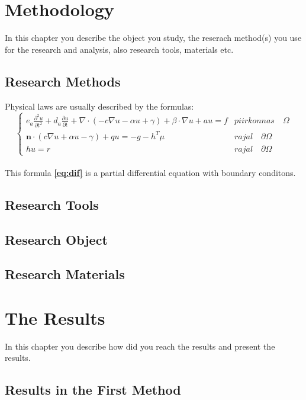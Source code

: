 \documentclass[12pt]{report}
\begin{document}
\chapter{Methodology}
In this chapter you describe the object you study, the reserach method(s) you use for the research and analysis, also research tools, materials etc.
\section{Research Methods}
Physical laws are usually described by the formulas:
\\[5mm]
\begin{equation}
\label{eq:dif}
\left \{
\begin{array}{ll}
e_{a}\frac{\partial^{2}u}{\partial t^{2}} + d_{a}\frac{\partial u}{\partial t} + \nabla \cdot (-c\nabla u - \alpha u + \gamma) + \beta \cdot \nabla u + au = f & piirkonnas\quad \Omega\\
\mathbf{n}\cdot (c\nabla u +\alpha u -\gamma) + qu = -g-h^{T}\mu & rajal\quad \partial\Omega\\
hu = r & rajal\quad \partial\Omega
\end{array} \right .
\end{equation}
\\[5mm]
This formula \textbf{\ref{eq:dif}} is a partial differential equation with boundary conditons.
\\[5mm]
\lipsum[12]
\section{Research Tools}
\lipsum[13]
\section{Research Object}
\lipsum[14]
\section{Research Materials}
\lipsum[21]
\chapter{The Results}
In this chapter you describe how did you reach the results and present the results.
\section{Results in the First Method}
\lipsum[15]
\end{document}

